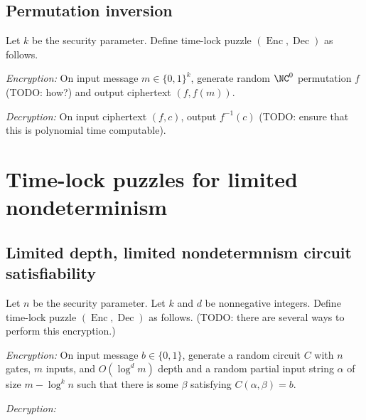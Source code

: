 \documentclass{article}
\newcommand{\Enc}{\operatorname{Enc}}
\newcommand{\Dec}{\operatorname{Dec}}
\begin{document}
\subsection{Permutation inversion}

\begin{protocol}
  Let $k$ be the security parameter.
  Define time-lock puzzle $(\Enc, \Dec)$ as follows.

  \emph{Encryption:} On input message $m \in \{0, 1\}^k$, generate random $\NC^0$ permutation $f$ (TODO: how?) and output ciphertext $(f, f(m))$.

  \emph{Decryption:} On input ciphertext $(f, c)$, output $f^{-1}(c)$ (TODO: ensure that this is polynomial time computable).
\end{protocol}

\section{Time-lock puzzles for limited nondeterminism}

\subsection{Limited depth, limited nondetermnism circuit satisfiability}

\begin{protocol}
  Let $n$ be the security parameter.
  Let $k$ and $d$ be nonnegative integers.
  Define time-lock puzzle $(\Enc, \Dec)$ as follows.
  (TODO: there are several ways to perform this encryption.)

  \emph{Encryption:} On input message $b \in \{0, 1\}$, generate a random circuit $C$ with $n$ gates, $m$ inputs, and $O(\log^d m)$ depth and a random partial input string $\alpha$ of size $m - \log^k n$ such that there is some $\beta$ satisfying $C(\alpha, \beta) = b$.

  \emph{Decryption:} 
\end{protocol}

\end{document}

